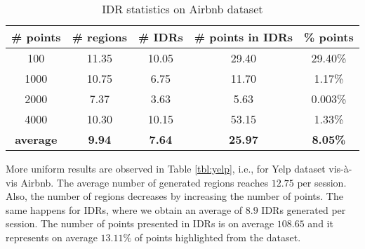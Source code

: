 \documentclass[sigconf,edbt]{acmart-edbt2019}
\begin{document}
\begin{table}[h]
\centering
\caption{IDR statistics on Airbnb dataset}
\label{tbl:airbnb}
\begin{tabular}{|c|c|c|c|c|}
\cline{1-5}
\textbf{\# points}  & \textbf{\# regions} 	& \textbf{\# IDRs} 	& \textbf{\# points in IDRs}	& \textbf{\%  points}	\\ \hline
\multicolumn{1}{|c|}{100} 				& 11.35            	& 10.05	          	& 29.40             & 29.40\%            
 \\ \hline
\multicolumn{1}{|c|}{1000} 				& 10.75          	& 6.75	          	& 11.70              & 1.17\%              \\ \hline
\multicolumn{1}{|c|}{2000} 				& 7.37           	& 3.63         	& 5.63             & 0.003\%              \\ \hline
\multicolumn{1}{|c|}{4000} 				& 10.30           	& 10.15	          	& 53.15              & 1.33\%              \\ \hline
\multicolumn{1}{|c|}{\textbf{average}} 				& \textbf{9.94}           	& \textbf{7.64}	          	&\textbf{ 25.97}              & \textbf{8.05\% }             \\ \hline

\end{tabular}
\end{table}

\vspace{2pt}
More uniform results are observed in Table \ref{tbl:yelp}, i.e., for Yelp dataset vis-\`a-vis Airbnb. The average number of generated regions reaches $12.75$ per session. Also, the number of regions decreases by increasing the number of points. The same happens for IDRs, where we obtain an average of $8.9$ IDRs generated per session. The number of points presented in IDRs is on average $108.65$ and it represents on average $13.11\%$ of points highlighted from the dataset.

\end{document}

